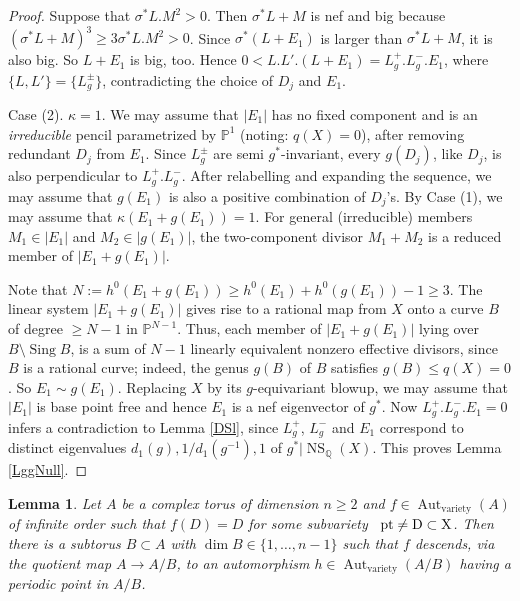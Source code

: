 \documentclass[11pt,a4paper,psamsfonts]{amsart}
\theoremstyle{plain}
\newtheorem{lemma}[thm]{Lemma}
\theoremstyle{definition}
\theoremstyle{remark}
\begin{document}
\begin{proof}
Suppose that $\sigma^*L . M^2 > 0$. Then $\sigma^*L + M$
is nef and big because $(\sigma^*L+M)^3 \ge 3\sigma^*L . M^2 > 0$.
Since $\sigma^*(L + E_1)$ is larger than $\sigma^*L + M$,
it is also big. So $L + E_1$ is big, too.
Hence $0 < L . L' . (L + E_1) = L_g^+ . L_g^- . E_1$,
where $\{L, L'\} = \{L_g^{\pm}\}$,
contradicting
the choice of $D_j$ and $E_1$.

Case (2). $\kappa = 1$. We may assume that $|E_1|$ has no fixed
component and is an {\it irreducible}
pencil parametrized by ${\mathbb{P}}^1$ (noting: $q(X) = 0$), after removing redundant $D_j$ from $E_1$.
Since $L_g^{\pm}$ are semi $g^*$-invariant, every $g(D_j)$, like $D_j$, is
also perpendicular to $L_g^+ . L_g^-$.
After relabelling and expanding the sequence, we may assume that
$g(E_1)$ is also a positive combination of $D_j$'s.
By Case (1), we may assume that $\kappa(E_1 + g(E_1)) = 1$.
For general (irreducible) members $M_1 \in |E_1|$ and
$M_2 \in |g(E_1)|$, the two-component divisor $M_1 + M_2$ is a reduced member of
$|E_1 + g(E_1)|$.

Note that $N:= h^0(E_1 + g(E_1)) \ge h^0(E_1) + h^0(g(E_1)) - 1 \ge 3$.
The linear system $|E_1 + g(E_1)|$ gives rise to a rational map from $X$
onto a curve $B$ of degree $\ge N-1$ in ${\mathbb{P}}^{N-1}$.
Thus, each member of $|E_1 + g(E_1)|$ lying over $B \setminus {\operatorname{Sing}} B$,
is a sum of $N-1$ linearly equivalent nonzero effective divisors, since $B$ is a rational
curve; indeed, the genus $g(B)$ of $B$ satisfies $g(B) \le q(X) = 0$. So $E_1 \sim g(E_1)$.
Replacing $X$ by its $g$-equivariant blowup,
we may assume that $|E_1|$ is base point free and hence $E_1$ is a nef eigenvector of $g^*$.
Now $L_g^+ . L_g^- . E_1 = 0$ infers a contradiction to
Lemma \ref{DSl}, since $L_g^+$, $L_g^-$ and $E_1$ correspond to distinct eigenvalues $d_1(g), 1/d_1(g^{-1}), 1$ of $g^*|{\operatorname{NS}}_{\mathbb{Q}}(X)$.
This proves Lemma \ref{LggNull}.
\end{proof}

\begin{lemma}\label{torus}
Let $A$ be a complex torus of dimension $n \ge 2$
and $f \in {\operatorname{Aut}}_{\operatorname{variety}}(A)$ of infinite order such that
$f(D) = D$ for some subvariety \ $\rm{pt} \ne D \subset X$.
Then there is a subtorus $B \subset A$ with $\dim B \in \{1, \dots, n-1\}$
such that $f$
descends, via the quotient map $A \to A/B$,
to an automorphism $h \in {\operatorname{Aut}}_{\operatorname{variety}}(A/B)$
having a periodic point in $A/B$.
\end{lemma}
\end{document}

